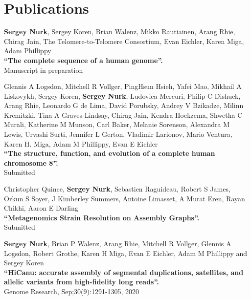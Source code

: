 \section{Publications}
\vspace*{-.7cm}
%
\begin{outerlist}

\item
\textbf{Sergey Nurk}, Sergey Koren, Brian Walenz, Mikko Rautiainen, Arang Rhie, Chirag Jain, The Telomere-to-Telomere Consortium, Evan Eichler, Karen Miga, Adam Phillippy\\
\textbf{``The complete sequence of a human genome''.}\\
Manuscript in preparation

\item
Glennis A Logsdon, Mitchell R Vollger, PingHsun Hsieh, Yafei Mao, Mikhail A Liskovykh, Sergey Koren, \textbf{Sergey Nurk}, Ludovica Mercuri, Philip C Dishuck, Arang Rhie, Leonardo G de Lima, David Porubsky, Andrey V Bzikadze, Milinn Kremitzki, Tina A Graves-Lindsay, Chirag Jain, Kendra Hoekzema, Shwetha C Murali, Katherine M Munson, Carl Baker, Melanie Sorenson, Alexandra M Lewis, Urvashi Surti, Jennifer L Gerton, Vladimir Larionov, Mario Ventura, Karen H. Miga, Adam M Phillippy, Evan E Eichler\\
\textbf{``The structure, function, and evolution of a complete human chromosome 8''.}\\
Submitted

\item
Christopher Quince, \textbf{Sergey Nurk}, Sebastien Raguideau, Robert S James, Orkun S Soyer, J Kimberley Summers, Antoine Limasset, A Murat Eren, Rayan Chikhi, Aaron E Darling\\
\textbf{``Metagenomics Strain Resolution on Assembly Graphs''.}\\
Submitted

\item
\textbf{Sergey Nurk}, Brian P Walenz, Arang Rhie, Mitchell R Vollger, Glennis A Logsdon, Robert Grothe, Karen H Miga, Evan E Eichler, Adam M Phillippy and Sergey Koren\\
\textbf{``HiCanu: accurate assembly of segmental duplications, satellites, and allelic variants from high-fidelity long reads''.}\\
Genome Research, Sep;30(9):1291-1305, 2020


\end{outerlist}
